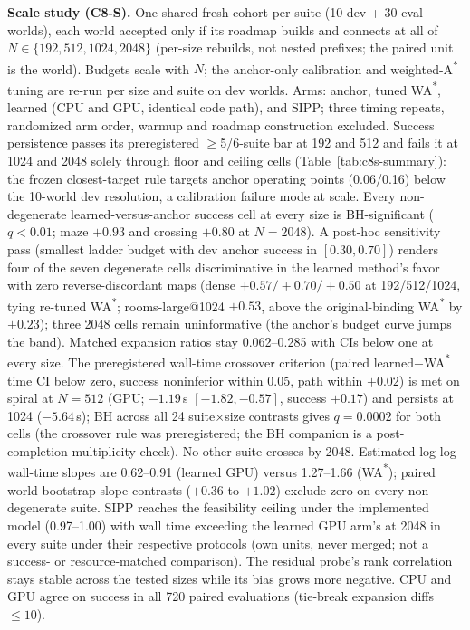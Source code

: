 \documentclass[letterpaper]{article} %
\begin{document}
\textbf{Scale study (C8-S).} One shared fresh cohort per suite (10 dev +
30 eval worlds), each world accepted only if its roadmap builds and
connects at all of $N \in \{192, 512, 1024, 2048\}$ (per-size rebuilds,
not nested prefixes; the paired unit is the world). Budgets scale with
$N$; the anchor-only calibration and weighted-A\textsuperscript{*} tuning
are re-run per size and suite on dev worlds. Arms: anchor, tuned
WA\textsuperscript{*}, learned (CPU and GPU, identical code path), and
SIPP; three timing repeats, randomized arm order, warmup and roadmap construction excluded. Success persistence passes its
preregistered $\geq$5/6-suite bar at 192 and 512 and fails it at 1024 and
2048 solely through floor and ceiling cells (Table~\ref{tab:c8s-summary}): the frozen closest-target
rule targets anchor operating points (0.06/0.16) below the 10-world dev
resolution, a calibration failure mode at scale. Every non-degenerate
learned-versus-anchor success cell at every size is BH-significant
($q<0.01$; maze $+0.93$ and crossing $+0.80$ at $N{=}2048$). A post-hoc sensitivity pass (smallest ladder budget with dev anchor success in $[0.30, 0.70]$) renders four of the seven degenerate cells discriminative in the learned method's
favor with zero reverse-discordant maps (dense $+0.57/+0.70/+0.50$ at
192/512/1024, tying re-tuned WA\textsuperscript{*}; rooms-large@1024
$+0.53$, above the original-binding WA\textsuperscript{*} by $+0.23$);
three 2048 cells remain uninformative (the anchor's budget curve jumps
the band). Matched expansion ratios stay 0.062--0.285 with CIs below one
at every size. The preregistered wall-time crossover criterion (paired
learned$-$WA\textsuperscript{*} time CI below zero, success noninferior
within 0.05, path within $+0.02$) is met on spiral at $N{=}512$ (GPU;
$-1.19$\,s $[-1.82,-0.57]$, success $+0.17$) and persists at 1024
($-5.64$\,s); BH across all 24 suite$\times$size contrasts gives
$q{=}0.0002$ for both cells (the crossover rule was preregistered; the BH companion is a post-completion multiplicity check). No other suite crosses by 2048. Estimated
log-log wall-time slopes are 0.62--0.91 (learned GPU) versus 1.27--1.66
(WA\textsuperscript{*}); paired world-bootstrap slope contrasts ($+0.36$ to $+1.02$) exclude zero on every non-degenerate suite. SIPP reaches the feasibility ceiling under the implemented model
(0.97--1.00) with wall time exceeding the learned GPU arm's at 2048 in
every suite under their respective protocols (own units, never merged;
not a success- or resource-matched comparison). The residual probe's rank correlation stays stable across the tested sizes while its bias grows more negative. CPU and GPU
agree on success in all 720 paired evaluations (tie-break expansion
diffs $\leq 10$).
\end{document}
